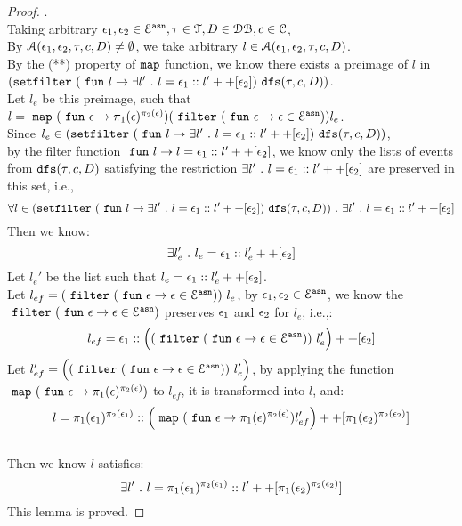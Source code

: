 \begin{proof}.
\\
Taking arbitrary $\mathtt{\epsilon}_1, \mathtt{\epsilon}_2 \in \mathcal{E}^{\mathtt{{asn}}}, \mathtt{\tau} \in \mathcal{T}, D \in \mathcal{DB} , c \in \mathcal{C}$,
\\
By $\mathcal{A}(\mathtt{\epsilon}_1, \mathtt{\epsilon}_2, \mathtt{\tau}, c, D) \neq \emptyset$, we take arbitrary $l \in \mathcal{A}(\mathtt{\epsilon}_1, \mathtt{\epsilon}_2, \mathtt{\tau}, c, D)$.
\\
By the (**) property of $\mathtt{map}$ function, we know there exists a preimage of $l$ in 
$(\mathtt{setfilter} ~(~\mathtt{fun}~ l \to \exists l' ~.~ l = \mathtt{\epsilon}_1 :: l' ++ [\mathtt{\epsilon}_2]) ~ \mathtt{dfs}(\mathtt{\tau}, c, D)) $. 
\\
Let $l_e$ be this preimage, such that
 $l = ~\mathtt{map}~ (~\mathtt{fun}~  \mathtt{\epsilon} \to \pi_1(\mathtt{\epsilon})^{\pi_2(\mathtt{\epsilon})}) (~\mathtt{filter}~ (~\mathtt{fun}~ \mathtt{\epsilon} \to  \mathtt{\epsilon} \in \mathcal{E}^{\mathtt{{asn}}})) l_e$.
\\
Since $l_e \in (\mathtt{setfilter} ~(~\mathtt{fun}~ l \to \exists l' ~.~ l = \mathtt{\epsilon}_1 :: l' ++ [\mathtt{\epsilon}_2]) ~ \mathtt{dfs}(\mathtt{\tau}, c, D))$,
\\
by the filter function $~\mathtt{fun}~ l \to l = \mathtt{\epsilon}_1 :: l' ++ [\mathtt{\epsilon}_2]$,
we know only the lists of events from $\mathtt{dfs}(\mathtt{\tau}, c, D)$ satisfying the restriction 
$\exists l' ~.~ l = \mathtt{\epsilon}_1 :: l' ++ [\mathtt{\epsilon}_2]$ are preserved in this set, i.e.,
\[
	\forall l \in (\mathtt{setfilter} ~(~\mathtt{fun}~ l \to \exists l' ~.~ l = \mathtt{\epsilon}_1 :: l' ++ [\mathtt{\epsilon}_2]) ~ \mathtt{dfs}(\mathtt{\tau}, c, D))
	~.~ \exists l' ~.~ l = \mathtt{\epsilon}_1 :: l' ++ [\mathtt{\epsilon}_2] 
\]
%
Then we know:
%
\[
 \exists l_e' ~.~ l_e = \mathtt{\epsilon}_1 :: l_e' ++ [\mathtt{\epsilon}_2] 
\]
%
Let $l_e'$ be the list such that $l_e = \mathtt{\epsilon}_1 :: l_e' ++ [\mathtt{\epsilon}_2] $.
\\
Let $l_{ef} = (~\mathtt{filter}~ (~\mathtt{fun}~ \mathtt{\epsilon} \to  \mathtt{\epsilon} \in \mathcal{E}^{\mathtt{{asn}}})) ~ l_e$, 
by $\mathtt{\epsilon}_1, \mathtt{\epsilon}_2 \in \mathcal{E}^{\mathtt{{asn}}}$, 
we know the $~\mathtt{filter}~ (~\mathtt{fun}~ \mathtt{\epsilon} \to  \mathtt{\epsilon} \in \mathcal{E}^{\mathtt{{asn}}})$ preserves $\mathtt{\epsilon}_1$ and $\mathtt{\epsilon}_2$ for 
$l_e$, i.e.,:
\[
	l_{ef} = \mathtt{\epsilon}_1 :: \Big((~\mathtt{filter}~ (~\mathtt{fun}~ \mathtt{\epsilon} \to  \mathtt{\epsilon} \in \mathcal{E}^{\mathtt{{asn}}}))~ l_e' \Big) ++ [\mathtt{\epsilon}_2]
\]
%
Let $l_{ef}' = \Big((~\mathtt{filter}~ (~\mathtt{fun}~ \mathtt{\epsilon} \to  \mathtt{\epsilon} \in \mathcal{E}^{\mathtt{{asn}}}))~ l_e' \Big)$, by applying the function
$~\mathtt{map}~ (~\mathtt{fun}~  \mathtt{\epsilon} \to \pi_1(\mathtt{\epsilon})^{\pi_2(\mathtt{\epsilon})})$ to 
$l_{ef}$, it is transformed into $l$, and:
\[
	l = 
	\pi_1(\mathtt{\epsilon}_1)^{\pi_2(\mathtt{\epsilon}_1)} :: \Big( ~\mathtt{map}~ (~\mathtt{fun}~  \mathtt{\epsilon} \to \pi_1(\mathtt{\epsilon})^{\pi_2(\mathtt{\epsilon})}) l_{ef}' \Big) ++ [\pi_1(\mathtt{\epsilon}_2)^{\pi_2(\mathtt{\epsilon}_2)}]
\]
%
\\
%
Then we know $l$ satisfies:
\[
	\exists l' ~.~ l = \pi_1(\mathtt{\epsilon}_1)^{\pi_2(\mathtt{\epsilon}_1)} :: l' ++ [\pi_1(\mathtt{\epsilon}_2)^{\pi_2(\mathtt{\epsilon}_2)}]
\]
%
This lemma is proved.
\end{proof}
